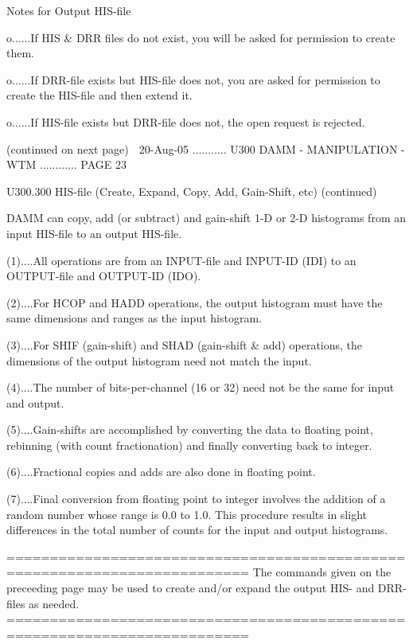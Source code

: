    Notes for Output HIS-file
 
   o......If  HIS  &  DRR files do not exist, you will be asked for permission
          to create them.
 
   o......If DRR-file  exists  but  HIS-file  does  not,  you  are  asked  for
          permission to create the HIS-file and then extend it.
 
   o......If  HIS-file  exists  but  DRR-file  does  not,  the open request is
          rejected.
 
                            (continued on next page)
    
   20-Aug-05 ........... U300  DAMM - MANIPULATION - WTM ............ PAGE  23
 
 
   U300.300  HIS-file (Create, Expand, Copy, Add, Gain-Shift, etc) (continued)
 
   DAMM can copy, add (or subtract) and gain-shift 1-D or 2-D histograms  from
   an input HIS-file to an output HIS-file.
 
   (1)....All  operations  are  from  an  INPUT-file  and INPUT-ID (IDI) to an
          OUTPUT-file and OUTPUT-ID (IDO).
 
   (2)....For HCOP and HADD operations, the output  histogram  must  have  the
          same dimensions and ranges as the input histogram.
 
   (3)....For  SHIF  (gain-shift)  and SHAD (gain-shift & add) operations, the
          dimensions of the output histogram need not match the input.
 
   (4)....The number of bits-per-channel (16 or 32) need not be the  same  for
          input and output.
 
   (5)....Gain-shifts  are  accomplished  by  converting  the data to floating
          point, rebinning (with count fractionation) and  finally  converting
          back to integer.
 
   (6)....Fractional copies and adds are also done in floating point.
 
   (7)....Final  conversion  from  floating  point  to  integer  involves  the
          addition of a  random  number  whose  range  is  0.0  to  1.0.  This
          procedure  results  in  slight  differences  in  the total number of
          counts for the input and output histograms.
 
   ==========================================================================
   The commands given on the preceeding page may be used to create and/or
   expand the output HIS- and DRR-files as needed.
   ==========================================================================
 
